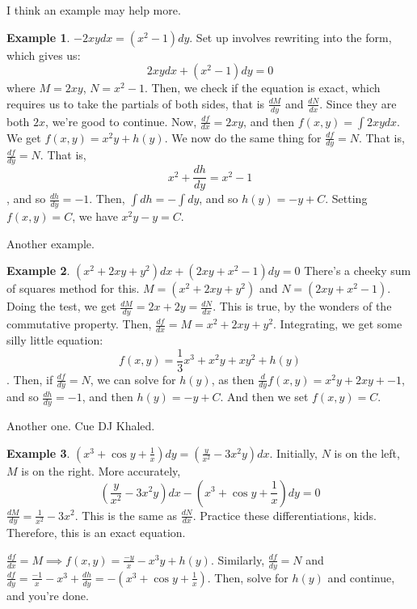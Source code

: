 \documentclass[10pt, oneside]{article}
\theoremstyle{definition}
\newtheorem{example}{Example}[section]
\begin{document}
I think an example may help more.
\begin{example}
    $-2xy dx = (x^2-1)dy$. Set up involves rewriting into the form, which gives us:
    \[2xy dx + (x^2-1)dy = 0\] where $M = 2xy$, $N = x^2 -1$. Then, we check if the equation is exact, which requires us to take the partials of both sides, that is $\frac{dM}{dy}$ and $\frac{dN}{dx}$. Since they are both $2x$, we're good to continue. 
    Now, $\frac{df}{dx} = 2xy$, and then $f(x,y) = \int{2xy}dx$. We get $f(x,y) = x^2y + h(y)$. We now do the same thing for $\frac{df}{dy} = N$. That is, $\frac{df}{dy} = N$. That is, \[x^2 + \frac{dh}{dy} = x^2 - 1\], and so $\frac{dh}{dy} = -1$. Then, $\int{dh} = -\int{dy}$, and so $h(y) = -y + C$. Setting $f(x,y) = C$, we have $x^2y - y = C$. 
\end{example}
Another example. 
\begin{example}
    $(x^2 + 2xy + y^2)dx + (2xy+x^2-1)dy = 0$
    There's a cheeky sum of squares method for this. 
    $M = (x^2 + 2xy + y^2)$ and $N = (2xy+x^2-1)$. Doing the test, we get $\frac{dM}{dy} = 2x + 2y = \frac{dN}{dx}$. This is true, by the wonders of the commutative property. Then, $\frac{df}{dx} = M = x^2 + 2xy + y^2$. Integrating, we get some silly little equation:
    \[f(x,y) = \frac{1}{3}x^3 + x^2y + xy^2 + h(y) \]. Then, if $\frac{df}{dy} = N$, we can solve for $h(y)$, as then $\frac{d}{dy}{f(x,y)} = x^2y + 2xy + - 1$, and so $\frac{dh}{dy} = -1$, and then $h(y) = -y + C$. And then we set $f(x,y) = C$. 
\end{example}
Another one. Cue DJ Khaled. 
\begin{example}
    $(x^3 + \cos{y} + \frac{1}{x})dy = (\frac{y}{x^2}-3x^2y)dx$. Initially, $N$ is on the left, $M$ is on the right.
    More accurately, 
    \[
        (\frac{y}{x^2}-3x^2y)dx - (x^3 + \cos{y} + \frac{1}{x})dy = 0
    \]
    $\frac{dM}{dy} = \frac{1}{x^2} - 3x^2$. This is the same as $\frac{dN}{dx}$. Practice these differentiations, kids. Therefore, this is an exact equation. 

    $\frac{df}{dx} = M \implies f(x,y) = \frac{-y}{x} - x^3y + h(y)$. Similarly, $\frac{df}{dy} = N$ and $\frac{df}{dy} = \frac{-1}{x} - x^3 + \frac{dh}{dy} = - (x^3 + \cos{y} + \frac{1}{x})$. Then, solve for $h(y)$ and continue, and you're done. 

\end{example}
\end{document}
